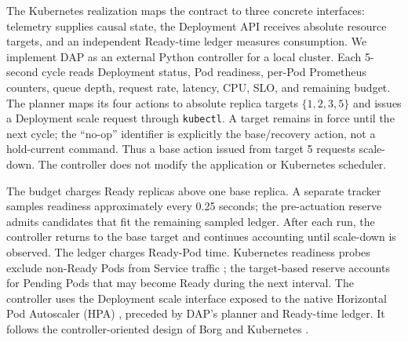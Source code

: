 \documentclass[acmsmall,screen,review,anonymous]{acmart}
\newcommand{\method}{\textsc{DAP}\xspace}
\begin{document}
The Kubernetes realization maps the contract to three concrete interfaces:
telemetry supplies causal state, the Deployment API receives absolute resource
targets, and an independent Ready-time ledger measures consumption. We
implement \method as an external Python controller for a local cluster.  Each 5-second cycle reads Deployment status, Pod readiness,
per-Pod Prometheus counters, queue depth, request rate, latency, CPU, SLO, and
remaining budget.  The planner maps its four actions to absolute replica
targets \(\{1,2,3,5\}\) and issues a Deployment scale request through
\texttt{kubectl}.  A target remains in force until the next cycle; the
``no-op'' identifier is explicitly the base/recovery action, not a hold-current
command.  Thus a base action
issued from target 5 requests scale-down.  The controller does not modify the
application or Kubernetes scheduler.

The budget charges Ready replicas above one base replica. A separate tracker
samples readiness approximately every 0.25 seconds; the pre-actuation reserve
admits candidates that fit the remaining sampled ledger.  After each run, the controller
returns to the base target and continues accounting until scale-down is
observed. The ledger charges Ready-Pod time. Kubernetes readiness probes
exclude non-Ready Pods from Service traffic \cite{kubernetesprobes}; the
target-based reserve accounts for Pending Pods that may become Ready during
the next interval.
The controller uses the Deployment scale interface exposed to the native
Horizontal Pod Autoscaler (HPA) \cite{kuberneteshpa}, preceded by DAP's planner
and Ready-time ledger. It follows the controller-oriented design of Borg and
Kubernetes \cite{verma2015borg,burns2016kubernetes}.
\end{document}
